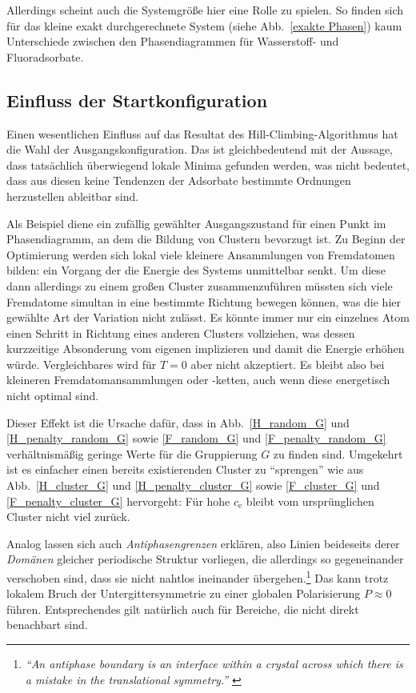 \documentclass[a4paper, 10pt, twoside, openany]{book} %
\def \cE {c_\mathrm{e}}
\begin{document}
	Allerdings scheint auch die Systemgröße hier eine Rolle zu spielen. So finden sich für das kleine exakt durchgerechnete System (siehe Abb.~\ref{exakte Phasen}) kaum Unterschiede zwischen den Phasendiagrammen für Wasserstoff- und Fluoradsorbate.
	
	\subsection{Einfluss der Startkonfiguration}
	\label{Startkonfiguration}
	
	Einen wesentlichen Einfluss auf das Resultat des Hill-Climbing-Algorithmus hat die Wahl der Ausgangskonfiguration. Das ist gleichbedeutend mit der Aussage, dass tatsächlich überwiegend lokale Minima gefunden werden, was nicht bedeutet, dass aus diesen keine Tendenzen der Adsorbate bestimmte Ordnungen herzustellen ableitbar sind.
	
	Als Beispiel diene ein zufällig gewählter Ausgangszustand für einen Punkt im Phasendiagramm, an dem die Bildung von Clustern bevorzugt ist. Zu Beginn der Optimierung werden sich lokal viele kleinere Ansammlungen von Fremdatomen bilden: ein Vorgang der die Energie des Systems unmittelbar senkt. Um diese dann allerdings zu einem großen Cluster zusammenzuführen müssten sich viele Fremdatome simultan in eine bestimmte Richtung bewegen können, was die hier gewählte Art der Variation nicht zulässt. Es könnte immer nur ein einzelnes Atom einen Schritt in Richtung eines anderen Clusters vollziehen, was dessen kurzzeitige Absonderung vom eigenen implizieren und damit die Energie erhöhen würde. Vergleichbares wird für $T = 0$ aber nicht akzeptiert. Es bleibt also bei kleineren Fremdatomansammlungen oder -ketten, auch wenn diese energetisch nicht optimal sind.
	
	Dieser Effekt ist die Ursache dafür, dass in Abb.~\ref{H_random_G} und \ref{H_penalty_random_G} sowie \ref{F_random_G} und \ref{F_penalty_random_G} verhältnismäßig geringe Werte für die Gruppierung $G$ zu finden sind. Umgekehrt ist es einfacher einen bereits existierenden Cluster zu "`sprengen"' wie aus Abb.~\ref{H_cluster_G} und \ref{H_penalty_cluster_G} sowie \ref{F_cluster_G} und \ref{F_penalty_cluster_G} hervorgeht: Für hohe $\cE$ bleibt vom ursprünglichen Cluster nicht viel zurück.
	
	Analog lassen sich auch \emph{Antiphasengrenzen} erklären, also Linien beideseits derer \emph{Domänen} gleicher periodische Struktur vorliegen, die allerdings so gegeneinander verschoben sind, dass sie nicht nahtlos ineinander übergehen.\footnote{\emph{"`An antiphase boundary is an interface within a crystal across which there is a mistake in the translational symmetry."'} \cite[S. 218f]{Putnis}} Das kann trotz lokalem Bruch der Untergittersymmetrie zu einer globalen Polarisierung $P \approx 0$ führen. Entsprechendes gilt natürlich auch für Bereiche, die nicht direkt benachbart sind.
	
\end{document}
